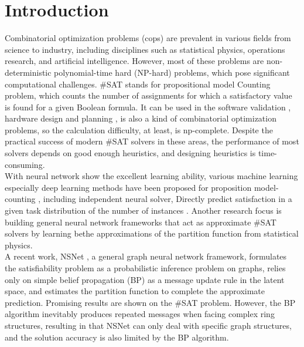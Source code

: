 \section{Introduction}

Combinatorial optimization problems (cops) are prevalent in various fields from science to industry, 
including disciplines such as statistical physics, operations research, and artificial intelligence. 
However, most of these problems are non-deterministic polynomial-time hard (NP-hard) problems, which 
pose significant computational challenges. \#SAT stands for propositional model Counting problem, 
which counts the number of assignments for which a satisfactory value is found for a given Boolean formula. 
It can be used in the software validation \cite{DBLP:journals/fmsd/ClarkeBRZ01}\cite{DBLP:journals/tcs/IvancicYGGA08}, 
hardware design and planning\cite{DBLP:conf/dac/SilvaS00}\cite{DBLP:conf/fmcad/SheeranSS00} 
\cite{DBLP:conf/aips/DomshlakH06}, is also a kind of combinatorial optimization problems, so the 
calculation difficulty, at least, is np-complete. Despite the practical success of modern \#SAT solvers 
in these areas, the performance of most solvers depends on good enough heuristics, and designing 
heuristics is time-consuming.\\

With neural network show the excellent learning ability, various machine learning especially deep 
learning methods have been proposed for proposition model-counting \cite{DBLP:conf/aaai/VaezipoorLWMGSB21}
\cite {Atkari_2019_10} \cite{DBLP:conf/ijcnn/OzolinsFDGZK22}, including independent neural solver, 
Directly predict satisfaction in a given task distribution of the number of instances 
\cite{DBLP:conf/iclr/AmizadehMW19}\cite{DBLP:journals/corr/abs-1903-01969}. Another research focus 
is building general neural network frameworks that act as approximate \#SAT solvers by learning bethe 
approximations of the partition function from statistical physics.\\

A recent work, NSNet \cite{DBLP:conf/nips/LiS22}, a general graph neural network framework, formulates 
the satisfiability problem as a probabilistic inference problem on graphs, relies only on simple belief 
propagation (BP) as a message update rule in the latent space, and estimates the partition function to 
complete the approximate prediction. Promising results are shown on the \#SAT problem. However, the BP 
algorithm inevitably produces repeated messages when facing complex ring structures, resulting in that 
NSNet can only deal with specific graph structures, and the solution accuracy is also limited by the BP 
algorithm.\\

